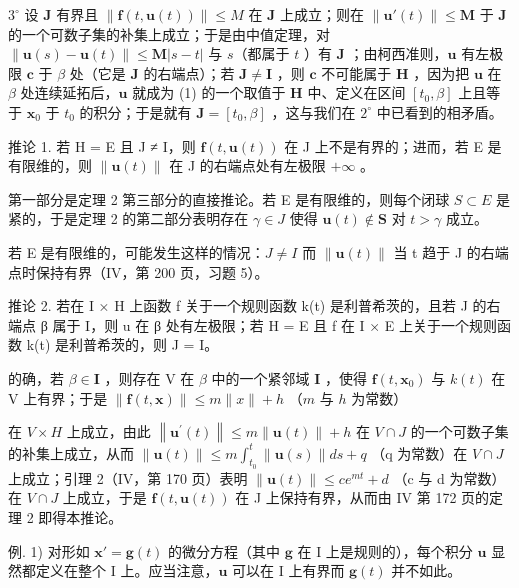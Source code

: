 \(3^{\circ}\) 设 \(\mathbf{J}\) 有界且 \(\| \mathbf{f}(t,\mathbf{u}(t))\| \leqslant M\) 在 \(\mathbf{J}\) 上成立；则在 \(\| \mathbf{u}'(t)\| \leqslant \mathbf{M}\) 于 \(\mathbf{J}\) 的一个可数子集的补集上成立；于是由中值定理，对 \(\| \mathbf{u}(s) - \mathbf{u}(t)\| \leqslant \mathbf{M} |s - t|\) 与 \(s\)（都属于 \(t\) ）有 \(\mathbf{J}\) ；由柯西准则，\(\mathbf{u}\) 有左极限 \(\mathbf{c}\) 于 \(\beta\) 处（它是 \(\mathbf{J}\) 的右端点）；若 \(\mathbf{J} \neq \mathbf{I}\) ，则 \(\mathbf{c}\) 不可能属于 \(\mathbf{H}\) ，因为把 \(\mathbf{u}\) 在 \(\beta\) 处连续延拓后，\(\mathbf{u}\) 就成为 (1) 的一个取值于 \(\mathbf{H}\) 中、定义在区间 \([t_0, \beta]\) 上且等于 \(\mathbf{x}_0\) 于 \(t_0\) 的积分；于是就有 \(\mathbf{J} = [t_0, \beta]\) ，这与我们在 \(2^{\circ}\) 中已看到的相矛盾。

推论 1. 若 H = E 且 J ≠ I，则 \(\mathbf{f}(t, \mathbf{u}(t))\) 在 J 上不是有界的；进而，若 E 是有限维的，则 \(\| \mathbf{u}(t) \|\) 在 J 的右端点处有左极限 \(+\infty\) 。

第一部分是定理 2 第三部分的直接推论。若 E 是有限维的，则每个闭球 \(S \subset E\) 是紧的，于是定理 2 的第二部分表明存在 \(\gamma \in J\) 使得 \(\mathbf{u}(t) \notin \mathbf{S}\) 对 \(t > \gamma\) 成立。

若 E 是有限维的，可能发生这样的情况：\(J \neq I\) 而 \(\|\mathbf{u}(t)\|\) 当 t 趋于 J 的右端点时保持有界（IV，第 200 页，习题 5）。

推论 2. 若在 I × H 上函数 f 关于一个规则函数 k(t) 是利普希茨的，且若 J 的右端点 β 属于 I，则 u 在 β 处有左极限；若 H = E 且 f 在 I × E 上关于一个规则函数 k(t) 是利普希茨的，则 J = I。

的确，若 \(\beta \in \mathbf{I}\) ，则存在 \(\mathrm{V}\) 在 \(\beta\) 中的一个紧邻域 \(\mathbf{I}\) ，使得 \(\mathbf{f}(t, \mathbf{x}_0)\) 与 \(k(t)\) 在 \(\mathrm{V}\) 上有界；于是 \(\| \mathbf{f}(t, \mathbf{x}) \| \leqslant m \| x \| + h\) （\(m\) 与 \(h\) 为常数）

在 \(V \times H\) 上成立，由此 \(\left\|\mathbf{u}^{\prime}(t)\right\| \leqslant m \left\|\mathbf{u}(t)\right\| + h\) 在 \(V \cap J\) 的一个可数子集的补集上成立，从而 \(\left\|\mathbf{u}(t)\right\| \leqslant m \int_{t_{0}}^{t} \left\|\mathbf{u}(s)\right\| ds + q\) （q 为常数）在 \(V \cap J\) 上成立；引理 2（IV，第 170 页）表明 \(\left\|\mathbf{u}(t)\right\| \leqslant c e^{mt} + d\) （c 与 d 为常数）在 \(V \cap J\) 上成立，于是 \(\mathbf{f}(t, \mathbf{u}(t))\) 在 J 上保持有界，从而由 IV 第 172 页的定理 2 即得本推论。

例. 1) 对形如 \(\mathbf{x}' = \mathbf{g}(t)\) 的微分方程（其中 \(\mathbf{g}\) 在 I 上是规则的），每个积分 \(\mathbf{u}\) 显然都定义在整个 I 上。应当注意，\(\mathbf{u}\) 可以在 I 上有界而 \(\mathbf{g}(t)\) 并不如此。

